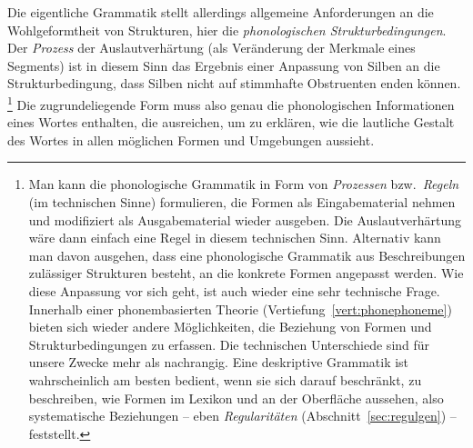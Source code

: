 Die eigentliche Grammatik stellt allerdings allgemeine Anforderungen an die Wohlgeformtheit von Strukturen, hier die \textit{phonologischen Strukturbedingungen}.
Der \textit{Prozess} der Auslautverhärtung (als Veränderung der Merkmale eines Segments) ist in diesem Sinn das Ergebnis einer Anpassung von Silben an die Strukturbedingung, dass Silben nicht auf stimmhafte Obstruenten enden können.%
\footnote{Man kann die phonologische Grammatik in Form von \textit{Prozessen} bzw.\ \textit{Regeln} (im technischen Sinne) formulieren, die Formen als Eingabematerial nehmen und modifiziert als Ausgabematerial wieder ausgeben.
Die Auslautverhärtung wäre dann einfach eine Regel in diesem technischen Sinn.
Alternativ kann man davon ausgehen, dass eine phonologische Grammatik aus Beschreibungen zulässiger Strukturen besteht, an die konkrete Formen angepasst werden.
Wie diese Anpassung vor sich geht, ist auch wieder eine sehr technische Frage.
Innerhalb einer phonembasierten Theorie (Vertiefung~\ref{vert:phonephoneme}) bieten sich wieder andere Möglichkeiten, die Beziehung von Formen und Strukturbedingungen zu erfassen.
Die technischen Unterschiede sind für unsere Zwecke mehr als nachrangig.
Eine deskriptive Grammatik ist wahrscheinlich am besten bedient, wenn sie sich darauf beschränkt, zu beschreiben, wie Formen im Lexikon und an der Oberfläche aussehen, also systematische Beziehungen -- eben \textit{Regularitäten} (Abschnitt~\ref{sec:regulgen}) -- feststellt.}
Die zugrundeliegende Form muss also genau die phonologischen Informationen eines Wortes enthalten, die ausreichen, um zu erklären, wie die lautliche Gestalt des Wortes in allen möglichen Formen und Umgebungen aussieht.


